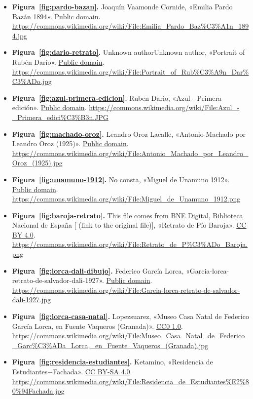 \documentclass{book}
\begin{document}
\begin{itemize}
\item \textbf{Figura~\ref{fig:pardo-bazan}.} Joaquín Vaamonde Cornide, «Emilia Pardo Bazán 1894». \href{https://creativecommons.org/publicdomain/mark/1.0/}{Public domain}. \url{https://commons.wikimedia.org/wiki/File:Emilia_Pardo_Baz%C3%A1n_1894.jpg}
\item \textbf{Figura~\ref{fig:dario-retrato}.} Unknown authorUnknown author, «Portrait of Rubén Darío». \href{https://creativecommons.org/publicdomain/mark/1.0/}{Public domain}. \url{https://commons.wikimedia.org/wiki/File:Portrait_of_Rub%C3%A9n_Dar%C3%ADo.jpg}
\item \textbf{Figura~\ref{fig:azul-primera-edicion}.} Ruben Dario, «Azul - Primera edición». \href{https://creativecommons.org/publicdomain/mark/1.0/}{Public domain}. \url{https://commons.wikimedia.org/wiki/File:Azul_-_Primera_edici%C3%B3n.JPG}
\item \textbf{Figura~\ref{fig:machado-oroz}.} Leandro Oroz Lacalle, «Antonio Machado por Leandro Oroz (1925)». \href{https://creativecommons.org/publicdomain/mark/1.0/}{Public domain}. \url{https://commons.wikimedia.org/wiki/File:Antonio_Machado_por_Leandro_Oroz_(1925).jpg}
\item \textbf{Figura~\ref{fig:unamuno-1912}.} No consta, «Miguel de Unamuno 1912». \href{https://creativecommons.org/publicdomain/mark/1.0/}{Public domain}. \url{https://commons.wikimedia.org/wiki/File:Miguel_de_Unamuno_1912.png}
\item \textbf{Figura~\ref{fig:baroja-retrato}.} This file comes from BNE Digital, Biblioteca Nacional de España [ (link to the original file)], «Retrato de Pío Baroja». \href{https://creativecommons.org/licenses/by/4.0/}{CC BY 4.0}. \url{https://commons.wikimedia.org/wiki/File:Retrato_de_P%C3%ADo_Baroja.png}
\item \textbf{Figura~\ref{fig:lorca-dali-dibujo}.} Federico García Lorca, «Garcia-lorca-retrato-de-salvador-dali-1927». \href{https://creativecommons.org/publicdomain/mark/1.0/}{Public domain}. \url{https://commons.wikimedia.org/wiki/File:Garcia-lorca-retrato-de-salvador-dali-1927.jpg}
\item \textbf{Figura~\ref{fig:lorca-casa-natal}.} Lopezsuarez, «Museo Casa Natal de Federico García Lorca, en Fuente Vaqueros (Granada)». \href{https://creativecommons.org/publicdomain/zero/1.0/}{CC0 1.0}. \url{https://commons.wikimedia.org/wiki/File:Museo_Casa_Natal_de_Federico_Garc%C3%ADa_Lorca,_en_Fuente_Vaqueros_(Granada).jpg}
\item \textbf{Figura~\ref{fig:residencia-estudiantes}.} Ketamino, «Residencia de Estudiantes\(-\)Fachada». \href{https://creativecommons.org/licenses/by-sa/4.0/}{CC BY-SA 4.0}. \url{https://commons.wikimedia.org/wiki/File:Residencia_de_Estudiantes%E2%80%94Fachada.jpg}

\end{itemize}
\end{document}
